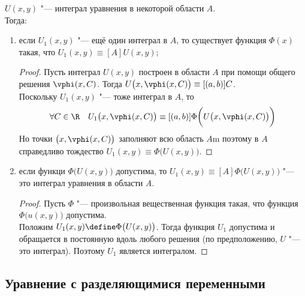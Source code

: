 \begin{theorem}
    $ U(x, y) $ "--- интеграл уравнения  в некоторой области $ A $. \\
    Тогда:
    \begin{enumerate}
    	\item если $ U_1(x, y) $ "--- ещё один интеграл в $ A $, то существует функция $ \Phi(x) $ такая, что $ U_1(x, y) \equiv[A] U(x, y) $;
        \begin{proof}
        	Пусть интеграл $ U(x, y) $ построен в области $ A $ при помощи общего решения $ \vphi(x, C) $. Тогда $ U \big( x, \vphi(x, C) \big) \equiv[(a, b)] C $. \\
            Поскольку $ U_1(x, y) $ "--- тоже интеграл в $ A $, то
            $$ \forall C \in \R \quad U_1 \big( x, \vphi(x, C) \big) \equiv[(a, b)] \Phi \bigg( U \big( x, \vphi(x, C) \big) \bigg) $$
            Но точки $ \big(x, \vphi(x, C) \big) $ заполняют всю область $ A $m поэтому в $ A $ справедливо тождество $ U_1(x, y) \equiv \Phi \big( U(x, y) \big) $.
        \end{proof}
        \item если функци $ \Phi \big( U(x, y) \big) $ допустима, то $ U_1(x, y) \equiv[A] \Phi \big( U(x, y) \big) $ "--- это интеграл уравнения  в области $ A $.
        \begin{proof}
        	Пусть $ \Phi $ "--- произвольная вещественная функция такая, что функция \\
            $ \Phi \big( u(x, y) \big) $ допустима. \\
            Положим $ U_1(x, y) \define \Phi \big( U(x, y) \big) $. Тогда функция $ U_1 $ допустима и обращается в постоянную вдоль любого решения (\as по предположению, $ U $ "--- это интеграл). Поэтому $ U_1 $ является интегралом.
        \end{proof}
    \end{enumerate}
\end{theorem}

\subsection{Уравнение с разделяющимися переменными}


